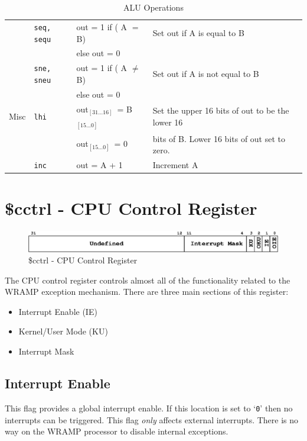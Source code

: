 \documentclass[a4paper,10pt]{article}
\begin{document}
\begin{table}[h]
\begin{center}
\begin{tabular}{|l|l|l|p{75mm}|}
\cline{2-4}
& \texttt{seq, sequ} & out = 1 if ( A $=$ B) & Set out if A
is equal to B \\
& & else out = 0 & \\
\cline{2-4}
& \texttt{sne, sneu} & out = 1 if ( A $\neq$ B) & Set out if A
is not equal to B \\
& & else out = 0 & \\
\hline
Misc & \texttt{lhi} & out\tiny$_{[31...16]}$\normalsize~= B\tiny$_{[15...0]}$ &
Set the upper 16 bits of out to be the lower 16 \\
& & out\tiny$_{[15...0]}$\normalsize~= 0 & bits of B. Lower 16 bits of out set to zero. \\ 
\cline{2-4}
& \texttt{inc} & out = A + 1 & Increment A\\
\hline
\end{tabular}
\end{center}
\caption{ALU Operations}
\label{table:alu}
\end{table}

\newpage
\section{\$cctrl - CPU Control Register}
\label{appen:cctrl}
\begin{figure}[h]
\begin{center}
\includegraphics[width=\textwidth]{cctrl.eps}
\caption{\$cctrl - CPU Control Register}
\label{cctrl_pic}
\end{center}
\end{figure}

The CPU control register controls almost all of the functionality
related to the WRAMP exception mechanism. There are three main
sections of this register:

\begin{itemize}
\item Interrupt Enable (IE)
\item Kernel/User Mode (KU)
\item Interrupt Mask
\end{itemize}

\subsection{Interrupt Enable}

This flag provides a global interrupt enable. If this location is set
to `\texttt{0}' then no interrupts can be triggered. This flag
\emph{only} affects external interrupts. There is no way on the WRAMP
processor to disable internal exceptions.
\end{document}
